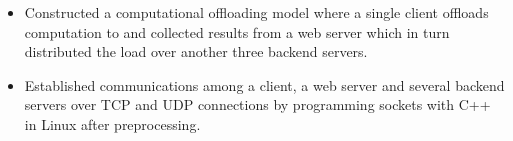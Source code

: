 {
	{\begin{itemize}
		\item Constructed a computational offloading model where a single client offloads computation to and collected results from a web server which in turn distributed the load over another three backend servers.
		\item Established communications among a client, a web server and several backend servers over TCP and UDP connections by programming sockets with C++ in Linux after preprocessing.
  	\end{itemize}
  }
}
